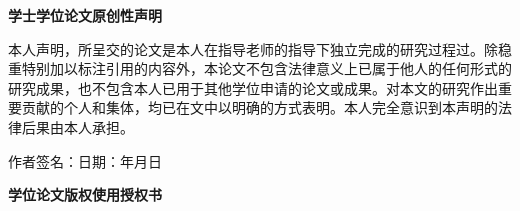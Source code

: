 %
%
%
%
%
%


\pagestyle{originality}
\topskip=0pt

\newcommand{\circled}[2][]{\tikz[baseline=(char.base)]
  {\node[shape = circle, draw, inner sep = 1pt]
  (char) {\phantom{\ifblank{#1}{#2}{#1}}};
  \node at (char.center) {\makebox[0pt][c]{#2}};}}
\robustify{\circled}

\setlength{\parskip}{0.4em}
\renewcommand{\baselinestretch}{1.41}

\vspace*{-6mm}

\begin{center}
  \heiti{}\textbf{学士学位论文原创性声明}
\end{center}


本人声明，所呈交的论文是本人在指导老师的指导下独立完成的研究过程过。除稳重特别加以标注引用的内容外，本论文不包含法律意义上已属于他人的任何形式的研究成果，也不包含本人已用于其他学位申请的论文或成果。对本文的研究作出重要贡献的个人和集体，均已在文中以明确的方式表明。本人完全意识到本声明的法律后果由本人承担。

\vspace{13mm}

\begin{flushright}
  作者签名：\hspace{40mm}日\hspace{2.5mm}期：\hspace{13mm}年\hspace{8mm}月\hspace{8mm}日
\end{flushright}

\vspace{17mm}

\begin{center}
  \heiti{}\textbf{学位论文版权使用授权书}
\end{center}

